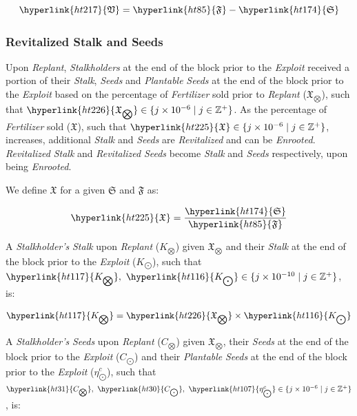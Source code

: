 \documentclass[tikz]{article}
\newcommand{\term}[1]{\textsl{#1}}
\begin{document}
    $$
        \hyperlink{ht217}{\mathfrak{V}} = \hyperlink{ht85}{\mathfrak{F}} - \hyperlink{ht174}{\mathfrak{S}}
    $$

\subsubsection{Revitalized Stalk and Seeds}

Upon \term{Replant}, \term{Stalkholders} at the end of the block prior to the \term{Exploit} received a portion of their \term{Stalk}, \term{Seeds} and \term{Plantable} \term{Seeds} at the end of the block prior to the \term{Exploit} based on the percentage of \term{Fertilizer} sold prior to \term{Replant} (\hyperlink{ht226}{$\mathfrak{X}_{\bigotimes}$}), such that $\hyperlink{ht226}{\mathfrak{X}_{\bigotimes}} \in \{j \times 10^{-6} \mid j \in \mathbb{Z}^{+} \}$. As the percentage of \term{Fertilizer} sold (\hyperlink{ht225}{$\mathfrak{X}$}), such that $\hyperlink{ht225}{\mathfrak{X}} \in \{j \times 10^{-6} \mid j \in \mathbb{Z}^{+} \}$, increases, additional \term{Stalk} and \term{Seeds} are \term{Revitalized} and can be \term{Enrooted}. \term{Revitalized} \term{Stalk} and \term{Revitalized} \term{Seeds} become \term{Stalk} and \term{Seeds} respectively, upon being \term{Enrooted}. 

We define \hyperlink{ht225}{$\mathfrak{X}$} for a given \hyperlink{ht174}{$\mathfrak{S}$} and \hyperlink{ht85}{$\mathfrak{F}$} as:

    $$
        \hyperlink{ht225}{\mathfrak{X}} = \frac{\hyperlink{ht174}{\mathfrak{S}}}
                                            {\hyperlink{ht85}{\mathfrak{F}}}
    $$
    
A \term{Stalkholder's} \term{Stalk} upon \term{Replant} (\hyperlink{ht117}{$K_{\bigotimes}$}) given \hyperlink{ht226}{$\mathfrak{X}_{\bigotimes}$} and their \term{Stalk} at the end of the block prior to the \term{Exploit} (\hyperlink{ht116}{$K_{\bigodot}$}), such that $\hyperlink{ht117}{K_{\bigotimes}},\ \hyperlink{ht116}{K_{\bigodot}} \in \{j \times 10^{-10} \mid j \in \mathbb{Z}^{+} \}$, is:

    $$
        \hyperlink{ht117}{K_{\bigotimes}} = \hyperlink{ht226}{\mathfrak{X}_{\bigotimes}} \times 
                                                \hyperlink{ht116}{K_{\bigodot}}
    $$

A \term{Stalkholder's} \term{Seeds} upon \term{Replant} (\hyperlink{ht31}{$C_{\bigotimes}$}) given \hyperlink{ht226}{$\mathfrak{X}_{\bigotimes}$}, their \term{Seeds} at the end of the block prior to the \term{Exploit} (\hyperlink{ht30}{$C_{\bigodot}$}) and their \term{Plantable} \term{Seeds} at the end of the block prior to the \term{Exploit} (\hyperlink{ht107}{$\eta_{\bigodot}^c$}), such that $\hyperlink{ht31}{C_{\bigotimes}},\ \hyperlink{ht30}{C_{\bigodot}},\ \hyperlink{ht107}{\eta_{\bigodot}^c} \in \{j \times 10^{-6} \mid j \in \mathbb{Z}^{+} \}$, is:
\end{document}
